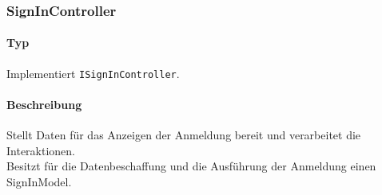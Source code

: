 \subsubsection{SignInController}\label{App_Signup_SignInController}
\paragraph*{Typ}
Implementiert \texttt{ISignInController}.
\paragraph*{Beschreibung}
Stellt Daten für das Anzeigen der Anmeldung bereit und verarbeitet die Interaktionen.\\
Besitzt für die Datenbeschaffung und die Ausführung der Anmeldung einen SignInModel.
